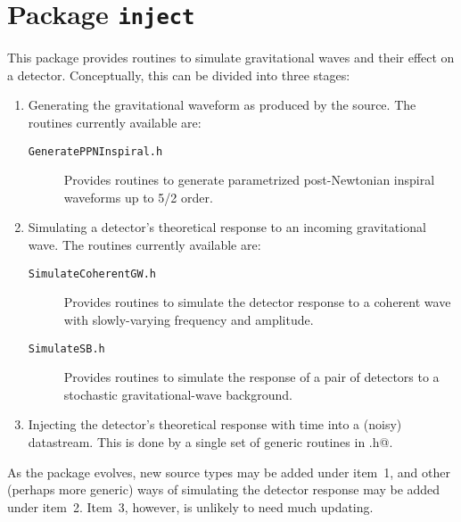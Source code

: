 \chapter{Package \texttt{inject}}

This package provides routines to simulate gravitational waves and
their effect on a detector.  Conceptually, this can be divided into
three stages:
\begin{enumerate}
\item Generating the gravitational waveform as produced by the source.
The routines currently available are:
\begin{description}
\item[\texttt{GeneratePPNInspiral.h}] Provides routines to generate
parametrized post-Newtonian inspiral waveforms up to 5/2 order.
\end{description}

\item Simulating a detector's theoretical response to an incoming
gravitational wave.  The routines currently available are:
\begin{description}
\item[\texttt{SimulateCoherentGW.h}] Provides routines to simulate the
detector response to a coherent wave with slowly-varying frequency and
amplitude.
\item[\texttt{SimulateSB.h}] Provides routines to simulate the
  response of a pair of detectors to a stochastic gravitational-wave
  background.
\end{description}

\item Injecting the detector's theoretical response with time into a
(noisy) datastream.  This is done by a single set of generic routines
in \verb@Inject.h@.
\end{enumerate}

As the package evolves, new source types may be added under item~1,
and other (perhaps more generic) ways of simulating the detector
response may be added under item~2.  Item~3, however, is unlikely to
need much updating.

\newpage
\newpage
\newpage
\newpage
\newpage
\newpage

